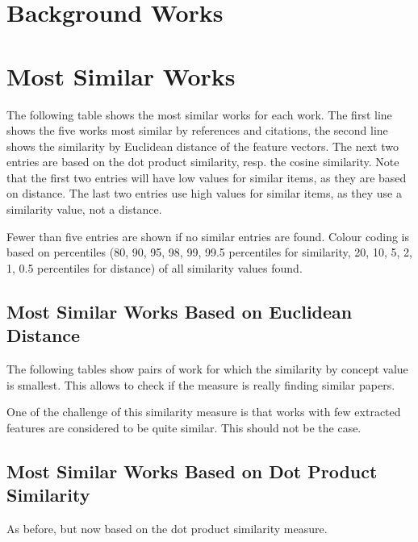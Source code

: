 \documentclass[a4paper]{article}
\begin{document}
\clearpage
\section{Background Works}



\clearpage
\section{Most Similar Works}

The following table shows the most similar works for each work. The first line shows the five works most similar by references and citations, the second line shows the similarity by Euclidean distance of the feature vectors. The next two entries are based on the dot product similarity, resp. the cosine similarity. Note that the first two entries will have low values for similar items, as they are based on distance. The last two entries use high values for similar items, as they use a similarity value, not a distance.

Fewer than five entries are shown if no similar entries are found. Colour coding is based on percentiles (80, 90, 95, 98, 99, 99.5 percentiles for similarity, 20, 10, 5, 2, 1, 0.5 percentiles for distance) of all similarity values found.



\clearpage
\subsection{Most Similar Works Based on Euclidean Distance}

The following tables show pairs of work for which the similarity by concept value is smallest. This allows to check if the measure is really finding similar papers.

One of the challenge of this similarity measure is that works with few extracted features are considered to be quite similar. This should not be the case.





\clearpage
\subsection{Most Similar Works Based on Dot Product Similarity}

As before, but now based on the dot product similarity measure.
\end{document}

